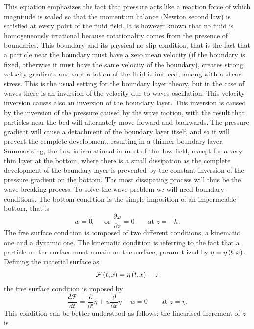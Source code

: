 This equation emphasizes the fact that pressure acts like a reaction force of which magnitude is scaled so that the momentum balance (Newton second law) is satisfied at every point of the fluid field. It is however known that no fluid is homogeneously irrational because rotationality comes from the presence of boundaries. This boundary and its physical no-slip condition, that is the fact that a particle near the boundary must have a zero mean velocity (if the boundary is fixed, otherwise it must have the same velocity of the boundary), creates strong velocity gradients and so a rotation of the fluid is induced, among with a shear stress. This is the usual setting for the boundary layer theory, but in the case of waves there is an inversion of the velocity due to waves oscillation. This velocity inversion causes also an inversion of the boundary layer. This inversion is caused by the inversion of the pressure caused by the wave motion, with the result that particles near the bed will alternately move forward and backwards. The pressure gradient will cause a detachment of the boundary layer itself, and so it will prevent the complete development, resulting in a thinner boundary layer. Summarizing, the flow is irrotational in most of the flow field, except for a very thin layer at the bottom, where there is a small dissipation as the complete development of the boundary layer is prevented by the constant inversion of the pressure gradient on the bottom. The most dissipating process will thus be the wave breaking process. To solve the wave problem we will need boundary conditions. The bottom condition is the simple imposition of an impermeable bottom, that is 
\begin{equation}
w=0, \quad \text{ or } \dfrac{\partial\varphi}{\partial z}=0 \qquad \text{at } z=-h.
\end{equation}
The free surface condition is composed of two different conditions, a kinematic one and a dynamic one. The kinematic condition is referring to the fact that a particle on the surface must remain on the surface, parametrized by $\eta=\eta\left( t,x \right)$. Defining the material surface as
\begin{equation}
\mathcal{F}\left( t,x \right)=\eta\left( t,x \right)-z
\end{equation}
the free surface condition is imposed by
\begin{equation*}
\dfrac{d\mathcal{F}}{dt}=\dfrac{\partial}{\partial t}\eta+u\dfrac{\partial}{\partial x}\eta - w =0   \qquad \text{at } z=\eta.
\end{equation*}
This condition can be better understood as follows: the linearised increment of $z$ is 
